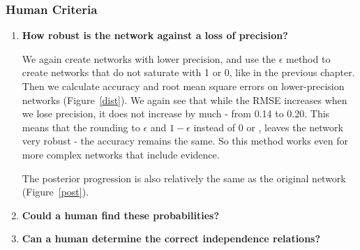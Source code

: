 \subsubsection{Human Criteria}
\begin{enumerate}
	\item \textbf{How robust is the network against a loss of precision?}

	We again create networks with lower precision, and use the $\epsilon$ method to create networks that do not saturate with 1 or 0, like in the previous chapter. Then we calculate accuracy and root mean square errors on lower-precision networks (Figure~\ref{dist}). We again see that while the RMSE increases when we lose precision, it does not increase by much - from 0.14 to 0.20. This means that the rounding to $\epsilon$ and $1-\epsilon$ instead of 0 or , leaves the network very robust - the accuracy remains the same. So this method works even for more complex networks that include evidence. 

	The posterior progression is also relatively the same as the original network (Figure~\ref{post}).
	\item \textbf{Could a human find these probabilities?}
	\item \textbf{ Can a human determine the correct independence relations?}
\end{enumerate}

